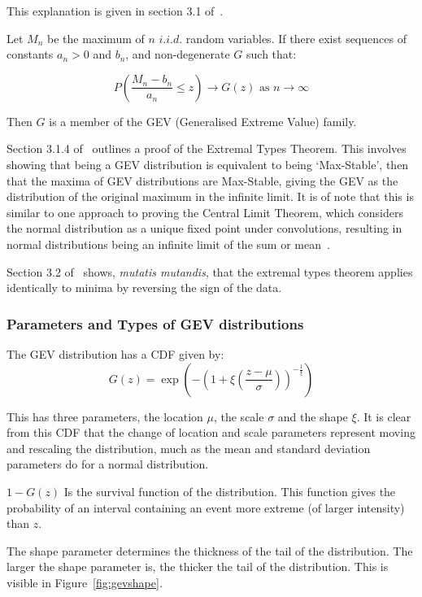 This explanation is given in section 3.1 of~\cite{Coles_2001}.

Let $M_n$ be the maximum of $n$ $i.i.d.$ random variables.
If there exist sequences of constants $a_n > 0$ and $b_n$, and non-degenerate $G$ such that:

\[ P\left( \frac{M_n - b_n}{a_n}  \leq z \right) \rightarrow G(z) \text{ as } n \rightarrow \infty \]

Then $G$ is a member of the GEV (Generalised Extreme Value) family.

Section 3.1.4 of~\cite{Coles_2001} outlines a proof of the Extremal Types Theorem.
This involves showing that being a GEV distribution is equivalent to being `Max-Stable',
    then that the maxima of GEV distributions are Max-Stable,
    giving the GEV as the distribution of the original maximum in the infinite limit.
It is of note that this is similar to one approach to proving the Central Limit Theorem,
    which considers the normal distribution as a unique fixed point under convolutions,
    resulting in normal distributions being an infinite limit of the sum or mean~\cite{Hamedani_Walter_1984}.

Section 3.2 of~\cite{Coles_2001} shows, \textit{mutatis mutandis},
    that the extremal types theorem applies identically to minima by reversing the sign of the data.

\subsubsection{Parameters and Types of GEV distributions}

The GEV distribution has a CDF given by:
\begin{equation}\label{eq:gevcdf}
    G(z) = \exp \left( - \left( 1 + \xi \left( \frac{z-\mu}{\sigma} \right)  \right)^{-\frac{1}{\xi}} \right)
\end{equation}

This has three parameters, the location $\mu$, the scale $\sigma$ and the shape $\xi$.
It is clear from this CDF that the change of location and scale parameters represent moving and rescaling the distribution,
    much as the mean and standard deviation parameters do for a normal distribution.

$1-G(z)$ Is the survival function of the distribution.
This function gives the probability of an interval containing an event more extreme (of larger intensity) than $z$.

The shape parameter determines the thickness of the tail of the distribution.
The larger the shape parameter is, the thicker the tail of the distribution.
This is visible in Figure~\ref{fig:gevshape}.

